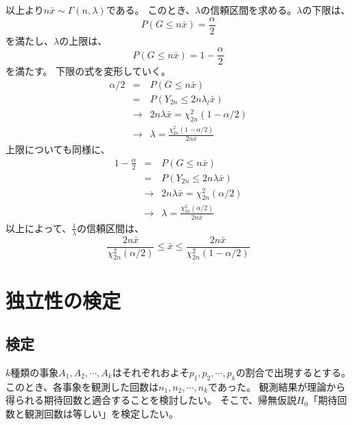 以上より$n\bar{x}\sim \Gamma(n,\lambda)$である。
このとき、$\lambda$の信頼区間を求める。$\lambda$の下限は、
\begin{equation}
    P(G\leq n\bar{x}) = \frac{\alpha}{2}
\end{equation}
を満たし、$\lambda$の上限は、
\begin{equation}
P(G\leq n\bar{x}) = 1-\frac{\alpha}{2}
\end{equation}
を満たす。
下限の式を変形していく。
\begin{eqnarray*}
    \alpha/2 &=& P(G\leq n\bar{x})  \\
    &=& P(Y_{2n}\leq 2n \lambda_l \bar{x})\\
    &\rightarrow& 2n\lambda \bar{x} = \chi^2_{2n}(1-\alpha/2)\\
    &\rightarrow& \lambda = \frac{\chi^2_{2n}(1-\alpha/2)}{2n\bar{x}}
\end{eqnarray*}
上限についても同様に、
\begin{eqnarray*}
    1-\frac{\alpha}{2} &= & P(G\leq n\bar{x}) \\
    &=& P(Y_{2n}\leq 2n\lambda \bar{x})  \\
    &\rightarrow& 2n\lambda \bar{x} = \chi^2_{2n}(\alpha/2)\\
    &\rightarrow&  \lambda = \frac{\chi^2_{2n}(\alpha/2)}{2n\bar{x}}
\end{eqnarray*}
以上によって、$\frac{1}{\lambda}$の信頼区間は、
\begin{equation}
    \label{exp_model_confidence_interval}
    \frac{2n\bar{x}}{\chi^2_{2n}(\alpha/2)} \leq \bar{x} \leq \frac{2n\bar{x}}{\chi^2_{2n}(1-\alpha/2)}
\end{equation}




\section{独立性の検定}

\subsection{検定}
$k$種類の事象$A_1,A_2,\cdots,A_k$はそれぞれおよそ$p_1,p_2,\cdots,p_k$の割合で出現するとする。このとき、各事象を観測した回数は$n_1,n_2,\cdots,n_k$であった。
観測結果が理論から得られる期待回数と適合することを検討したい。
そこで、帰無仮説$H_0$「期待回数と観測回数は等しい」を検定したい。

